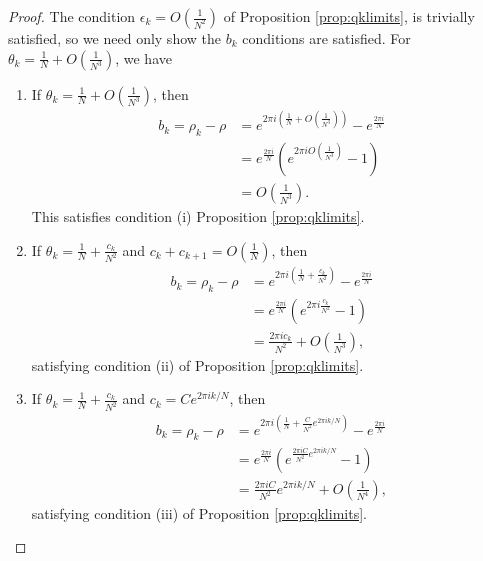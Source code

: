 \documentclass{amsart}
\theoremstyle{remark}
\theoremstyle{definition}
\newcommand{\lp}{\left(}
\newcommand{\rp}{\right)}
\begin{document}
\begin{proof}
The condition $\epsilon_{k} = O\lp\frac{1}{N^2}\rp$ of Proposition \ref{prop:qklimits}, is trivially satisfied, so we need only show the $b_{k}$ conditions are satisfied. 
For $\theta_k = \frac{1}{N} + O\lp\frac{1}{N^3}\rp$, we have
\begin{enumerate}
		\item If $\displaystyle{\theta_k = \frac{1}{N} + O\lp\frac{1}{N^3}\rp}$, then
        			\begin{align*}
        				b_{k} = \rho_{k} - \rho &= e^{2 \pi i\lp \frac{1}{N} +O\lp\frac{1}{N^3}\rp \rp} - e^{\frac{2 \pi i}{N}}\\
        				& = e^{\frac{2 \pi i}{N}} \lp e^{2 \pi i O\lp\frac{1}{N^3} \rp} -1 \rp \\
        				& = O\lp\frac{1}{N^3}\rp.
        			\end{align*}
		This satisfies condition (i) Proposition \ref{prop:qklimits}.
		\item If $\displaystyle{\theta_k = \frac{1}{N} + \frac{c_k}{N^2}}$ and $c_k+ c_{k+1} = O\lp \frac{1}{N} \rp$, then
		\begin{align*}
b_{k} = \rho_{k} - \rho &= e^{2 \pi i\lp \frac{1}{N} + \frac{c_k}{N^2} \rp} - e^{\frac{2 \pi i}{N}}\\
        				& = e^{\frac{2 \pi i}{N}} \lp e^{2 \pi i \frac{c_k}{N^2} } -1 \rp \\
        				& = \frac{2\pi i c_{k}}{N^2} + O\left(\frac{1}{N^{3}}\right),
        			\end{align*}
			satisfying condition (ii) of Proposition \ref{prop:qklimits}.
		\item If $\displaystyle{\theta_k = \frac{1}{N} + \frac{c_k}{N^2}}$ and $\displaystyle{c_k = Ce^{2\pi ik/N}}$, then
\begin{align*}
b_{k} = \rho_{k} - \rho &= e^{2 \pi i\lp \frac{1}{N} + \frac{C}{N^2}e^{2\pi ik/N} \rp} - e^{\frac{2 \pi i}{N}}\\
        				& = e^{\frac{2 \pi i}{N}} \lp e^{\frac{2\pi iC }{N^2}e^{2\pi ik/N}  } -1 \rp \\
        				& = \frac{2\pi iC}{N^2}e^{2\pi ik/N} + O\left(\frac{1}{N^{4}}\right),
    \end{align*}        
        satisfying condition (iii) of Proposition \ref{prop:qklimits}.
\end{enumerate} 
	\end{proof}
\end{document}
